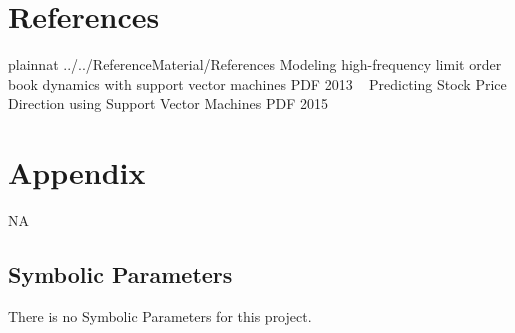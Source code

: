 \documentclass[12pt]{article}
\begin{document}
%
%
%

\newpage
\section{References}
 {plainnat}
 {../../ReferenceMaterial/References}
Modeling high-frequency limit order book dynamics with support vector machines  PDF 2013
~\newline
Predicting Stock Price Direction using Support Vector Machines PDF 2015

\newpage

\section{Appendix}

NA

\subsection{Symbolic Parameters}

There is no Symbolic Parameters for this project.
\end{document}

